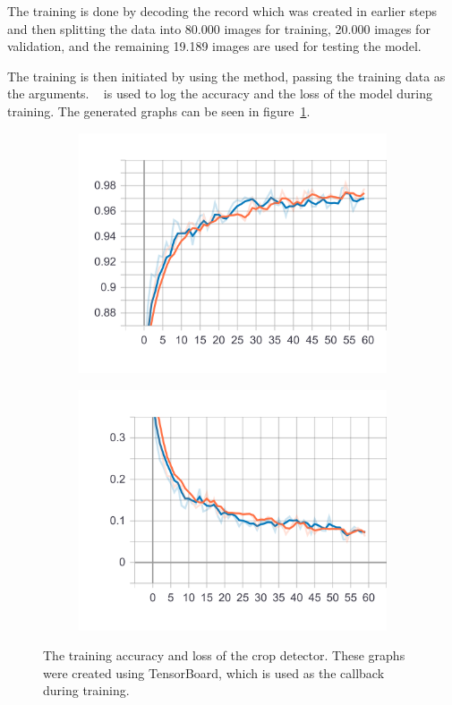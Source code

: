 The training is done by decoding the record which was created in earlier steps and then splitting the data into 80.000 images for training, 20.000 images for validation, and the remaining 19.189 images are used for testing the model.

The training is then initiated by using the  method, passing the training data as the arguments.
~\cite{Google2021} is used to log the accuracy and the loss of the model during training.
The generated graphs can be seen in figure~\ref{fig:crop_detector_tensorboard}.

\begin{figure}
    \centering
    \begin{subfigure}[b]{0.45\textwidth}
        \includegraphics[width=\textwidth]{images/crop_detector_epoch_acc.png}
    \end{subfigure}
    \begin{subfigure}[b]{0.45\textwidth}
        \includegraphics[width=\textwidth]{images/crop_detector_epoch_loss.png}
    \end{subfigure}
    \caption[TensorBoard output for the crop detector]{The training accuracy and loss of the crop detector. These graphs were created using TensorBoard, which is used as the callback during training.}\label{fig:crop_detector_tensorboard}
\end{figure}

